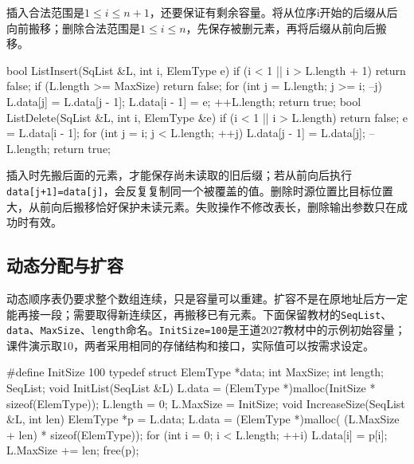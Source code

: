 插入合法范围是\(1\le i\le n+1\)，还要保证有剩余容量。将从位序i开始的后缀从后向前搬移；删除合法范围是\(1\le i\le n\)，先保存被删元素，再将后缀从前向后搬移。

\par\medskip\noindent\begin{minipage}{\linewidth}
\begin{codeblock}[language=C++]
bool ListInsert(SqList &L, int i, ElemType e) {
    if (i < 1 || i > L.length + 1) return false;
    if (L.length >= MaxSize) return false;
    for (int j = L.length; j >= i; --j)
        L.data[j] = L.data[j - 1];
    L.data[i - 1] = e;
    ++L.length;
    return true;
}
bool ListDelete(SqList &L, int i, ElemType &e) {
    if (i < 1 || i > L.length) return false;
    e = L.data[i - 1];
    for (int j = i; j < L.length; ++j)
        L.data[j - 1] = L.data[j];
    --L.length;
    return true;
}
\end{codeblock}
\end{minipage}\par\medskip

插入时先搬后面的元素，才能保存尚未读取的旧后缀；若从前向后执行\texttt{data[\allowbreak{}j+\allowbreak{}1]\allowbreak{}=\allowbreak{}data[\allowbreak{}j]\allowbreak{}}，会反复复制同一个被覆盖的值。删除时源位置比目标位置大，从前向后搬移恰好保护未读元素。失败操作不修改表长，删除输出参数只在成功时有效。

\subsection{动态分配与扩容}\label{DS02-dynamic}

动态顺序表仍要求整个数组连续，只是容量可以重建。扩容不是在原地址后方一定能再接一段；需要取得新连续区，再搬移已有元素。下面保留教材的\texttt{SeqList}、\texttt{data}、\texttt{MaxSize}、\texttt{length}命名。\texttt{InitSize=\allowbreak{}100}是王道2027教材中的示例初始容量；课件演示取10，两者采用相同的存储结构和接口，实际值可以按需求设定。

\par\medskip\noindent\begin{minipage}{\linewidth}
\begin{codeblock}[language=C++]
#define InitSize 100
typedef struct {
    ElemType *data;
    int MaxSize;
    int length;
} SeqList;
void InitList(SeqList &L) {
    L.data = (ElemType *)malloc(InitSize * sizeof(ElemType));
    L.length = 0;
    L.MaxSize = InitSize;
}
void IncreaseSize(SeqList &L, int len) {
    ElemType *p = L.data;
    L.data = (ElemType *)malloc(
        (L.MaxSize + len) * sizeof(ElemType));
    for (int i = 0; i < L.length; ++i)
        L.data[i] = p[i];
    L.MaxSize += len;
    free(p);
}
\end{codeblock}
\end{minipage}\par\medskip

